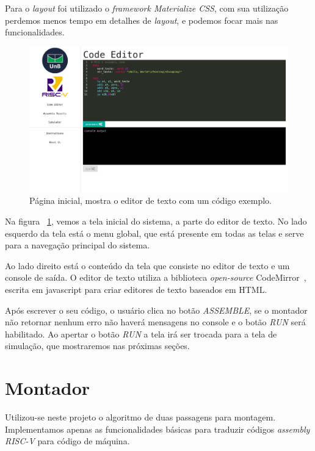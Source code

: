 	Para o \textit{layout} foi utilizado o \textit{framework Materialize CSS}, com sua utilização perdemos menos tempo em detalhes de \textit{layout}, e podemos focar mais nas funcionalidades.

	\begin{figure}[h]
	  \includegraphics[width=\linewidth]{img/code_editor.png}
	  \caption{Página inicial, mostra o editor de texto com um código exemplo.}
	  \label{fig:editor_texto}
	\end{figure}

	Na figura ~\ref{fig:editor_texto}, vemos a tela inicial do sistema, a parte do editor de texto. No lado esquerdo da tela está o menu global, que está presente em todas as telas e serve para a navegação principal do sistema.

	Ao lado direito está o conteúdo da tela que consiste no editor de texto e um console de saída. O editor de texto utiliza a biblioteca \textit{open-source} CodeMirror~\cite{codemirror}, escrita em javascript para criar editores de texto baseados em HTML.

	Após escrever o seu código, o usuário clica no botão \textit{ASSEMBLE}, se o montador não retornar nenhum erro não haverá mensagens no console e o botão \textit{RUN} será habilitado. Ao apertar o botão \textit{RUN} a tela irá ser trocada para a tela de simulação, que mostraremos nas próximas seções.

	
\section{Montador}
	
	Utilizou-se neste projeto o algoritmo de duas passagens para montagem. Implementamos apenas as funcionalidades básicas para traduzir códigos \textit{assembly RISC-V} para código de máquina.

